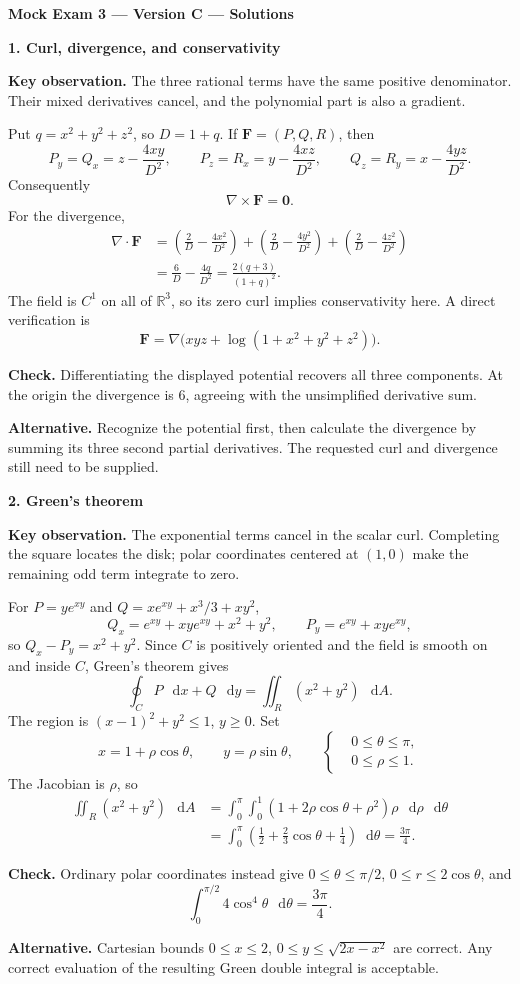 \documentclass[11pt,letterpaper]{article}
\newcommand{\curl}{\nabla\times}
\newcommand{\dv}{\nabla\cdot}
\renewcommand{\vec}[1]{\mathbf{#1}}
\newcommand{\dd}{\mathop{}\!\mathrm{d}}
\newcommand{\grad}{\nabla}
\newcommand{\solutionproblem}[3]{%
  \par\bigskip\Needspace{7\baselineskip}
  \noindent\textbf{#1. #2}\par\nobreak
}
\newcommand{\insight}[1]{\par\textbf{Key observation.} #1\par}
\newcommand{\verification}[1]{\par\textbf{Check.} #1\par}
\newcommand{\alternative}[1]{\par\textbf{Alternative.} #1\par}
\begin{document}
\clearpage
\setcounter{page}{1}
{\large\bfseries Mock Exam 3 --- Version C --- Solutions}
\smallskip
\solutionproblem{1}{Curl, divergence, and conservativity}{10}
\insight{The three rational terms have the same positive denominator.
Their mixed derivatives cancel, and the polynomial part is also a gradient.}
Put $q=x^2+y^2+z^2$, so $D=1+q$. If $\vec F=(P,Q,R)$, then
\[
P_y=Q_x=z-\frac{4xy}{D^2},\qquad
P_z=R_x=y-\frac{4xz}{D^2},\qquad
Q_z=R_y=x-\frac{4yz}{D^2}.
\]
Consequently
\[
\boxed{\curl\vec F=\vec0}.
\]
For the divergence,
\[
\begin{aligned}
\dv\vec F
&=\left(\frac2D-\frac{4x^2}{D^2}\right)
+\left(\frac2D-\frac{4y^2}{D^2}\right)
+\left(\frac2D-\frac{4z^2}{D^2}\right)\\
&=\frac6D-\frac{4q}{D^2}
=\boxed{\frac{2(q+3)}{(1+q)^2}}.
\end{aligned}
\]
The field is $C^1$ on all of $\mathbb R^3$, so its zero curl implies
conservativity here. A direct verification is
\[
\boxed{\vec F=\grad\bigl(xyz+\log(1+x^2+y^2+z^2)\bigr)}.
\]
\verification{Differentiating the displayed potential recovers all three
components. At the origin the divergence is $6$, agreeing with the
unsimplified derivative sum.}
\alternative{Recognize the potential first, then calculate the divergence
by summing its three second partial derivatives. The requested curl and
divergence still need to be supplied.}

\solutionproblem{2}{Green's theorem}{12}
\insight{The exponential terms cancel in the scalar curl. Completing
the square locates the disk; polar coordinates centered at $(1,0)$
make the remaining odd term integrate to zero.}
For $P=ye^{xy}$ and $Q=xe^{xy}+x^3/3+xy^2$,
\[
Q_x=e^{xy}+xye^{xy}+x^2+y^2,\qquad
P_y=e^{xy}+xye^{xy},
\]
so $Q_x-P_y=x^2+y^2$. Since $C$ is positively oriented and the field
is smooth on and inside $C$, Green's theorem gives
\[
\oint_C P\,\dd x+Q\,\dd y=\iint_R(x^2+y^2)\,\dd A.
\]
The region is $(x-1)^2+y^2\leq1$, $y\geq0$. Set
\[
x=1+\rho\cos\theta,\qquad y=\rho\sin\theta,\qquad
\left\{\begin{aligned}
&0\leq\theta\leq\pi,\\
&0\leq\rho\leq1.
\end{aligned}\right.
\]
The Jacobian is $\rho$, so
\[
\begin{aligned}
\iint_R(x^2+y^2)\,\dd A
&=\int_0^\pi\int_0^1(1+2\rho\cos\theta+\rho^2)\rho\,\dd\rho\,\dd\theta\\
&=\int_0^\pi\left(\frac12+\frac23\cos\theta+\frac14\right)\dd\theta
=\boxed{\frac{3\pi}{4}}.
\end{aligned}
\]
\verification{Ordinary polar coordinates instead give
$0\leq\theta\leq\pi/2$, $0\leq r\leq2\cos\theta$, and
\[
\int_0^{\pi/2}4\cos^4\theta\,\dd\theta=\frac{3\pi}{4}.
\]}
\alternative{Cartesian bounds $0\leq x\leq2$,
$0\leq y\leq\sqrt{2x-x^2}$ are correct. Any correct evaluation of
the resulting Green double integral is acceptable.}
\end{document}
